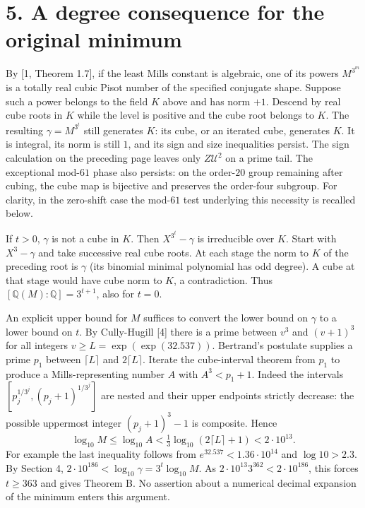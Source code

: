 \documentclass[11pt,a4paper,oneside,openany]{book}
\newcommand{\Q}{\mathbb Q}\newcommand{\C}{\mathbb C}\newcommand{\Z}{\mathbb Z}\newcommand{\F}{\mathbb F}\newcommand{\Tr}{\operatorname{Tr}}\newcommand{\Nm}{\operatorname{N}}\newcommand{\ord}{\operatorname{ord}}\newcommand{\K}{K}\newcommand{\OO}{\mathcal O_K}\newcommand{\unit}{\mathcal U}
\newcommand{\localhead}[1]{\needspace{5\baselineskip}\section*{\color{ink}#1}}
\let\sect\localhead\let\secx\localhead\let\head\localhead
\begin{document}
\sect{5. A degree consequence for the original minimum}
By [1, Theorem 1.7], if the least Mills constant is algebraic, one of its powers $M^{3^m}$ is a totally real cubic Pisot number of the specified conjugate shape. Suppose such a power belongs to the field $K$ above and has norm $+1$. Descend by real cube roots in $K$ while the level is positive and the cube root belongs to $K$. The resulting $\gamma=M^{3^t}$ still generates $K$: its cube, or an iterated cube, generates $K$. It is integral, its norm is still $1$, and its sign and size inequalities persist. The sign calculation on the preceding page leaves only $Z\unit^2$ on a prime tail. The exceptional mod-$61$ phase also persists: on the order-$20$ group remaining after cubing, the cube map is bijective and preserves the order-four subgroup. For clarity, in the zero-shift case the mod-$61$ test underlying this necessity is recalled below.

If $t>0$, $\gamma$ is not a cube in $K$. Then $X^{3^t}-\gamma$ is irreducible over $K$. Start with $X^3-\gamma$ and take successive real cube roots. At each stage the norm to $K$ of the preceding root is $\gamma$ (its binomial minimal polynomial has odd degree). A cube at that stage would have cube norm to $K$, a contradiction. Thus $[\Q(M):\Q]=3^{t+1}$, also for $t=0$.

An explicit upper bound for $M$ suffices to convert the lower bound on $\gamma$ to a lower bound on $t$. By Cully-Hugill [4] there is a prime between $v^3$ and $(v+1)^3$ for all integers $v\ge L=\exp(\exp(32.537))$. Bertrand's postulate supplies a prime $p_1$ between $\lceil L\rceil$ and $2\lceil L\rceil$. Iterate the cube-interval theorem from $p_1$ to produce a Mills-representing number $A$ with $A^3<p_1+1$. Indeed the intervals $[p_j^{1/3^j},(p_j+1)^{1/3^j}]$ are nested and their upper endpoints strictly decrease: the possible uppermost integer $(p_j+1)^3-1$ is composite. Hence
\[
 \log_{10}M\le\log_{10}A<\tfrac13\log_{10}(2\lceil L\rceil+1)
 <2\cdot10^{13}.
\]
For example the last inequality follows from $e^{32.537}<1.36\cdot10^{14}$ and $\log 10>2.3$. By Section 4, $2\cdot10^{186}<\log_{10}\gamma=3^t\log_{10}M$. As $2\cdot10^{13}3^{362}<2\cdot10^{186}$, this forces $t\ge363$ and gives Theorem B. No assertion about a numerical decimal expansion of the minimum enters this argument.
\end{document}
